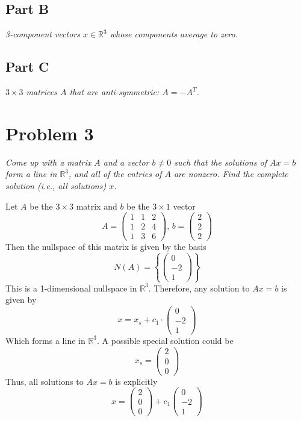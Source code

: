 \documentclass{article}
\begin{document}
\subsection*{Part B}

\textit{3-component vectors $x \in \mathbb{R}^3$ whose components average to
zero.}

\subsection*{Part C}

\textit{$3\times 3$ matrices $A$ that are anti-symmetric: $A = -A^T$.}

\section*{Problem 3}

\textit{Come up with a matrix $A$ and a vector $b \ne 0$ such that the
solutions of $Ax=b$ form a line in $\mathbb{R}^3$, and all of the entries of
$A$ are nonzero. Find the complete solution (i.e., all solutions) $x$.}

\bigbreak

Let $ A $ be the $ 3 \times 3 $ matrix and $ b $ be the $3 \times 1$ vector
$$ A = \begin{pmatrix}
    1 & 1 & 2 \\
    1 & 2 & 4 \\
    1 & 3 & 6
\end{pmatrix},\, b = \begin{pmatrix}
    2 \\
    2 \\
    2
\end{pmatrix} $$
Then the nullspace of this matrix is given by the basis
$$ N(A) = \left\{ \begin{pmatrix}
    0 \\
    -2 \\
    1
\end{pmatrix} \right\} $$
This is a 1-dimensional nullspace in $ \mathbb{R}^3 $. Therefore, any
solution to $ Ax = b $ is given by
$$ x = x_s + c_1 \cdot \begin{pmatrix}
    0 \\
    -2 \\
    1
\end{pmatrix} $$
Which forms a line in $ \mathbb{R}^3 $. A possible special solution could be
$$ x_s = \begin{pmatrix}
    2 \\
    0 \\
    0
\end{pmatrix} $$
Thus, all solutions to $ Ax = b $ is explicitly
$$ x = \begin{pmatrix}
    2 \\
    0 \\
    0
\end{pmatrix} + c_1 \begin{pmatrix}
    0 \\
    -2 \\
    1
\end{pmatrix} $$
\end{document}
